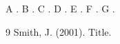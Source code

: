 \documentclass{article}
\begin{document}
A . B . C . D . E . F . G .
\begin{thebibliography}{9}
 Smith, J. (2001). Title.
\end{thebibliography}
\end{document}

